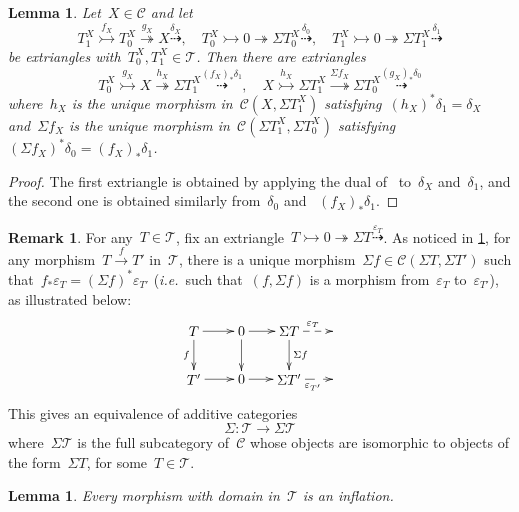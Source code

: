 \documentclass{amsart}
\newtheorem{lemma}[theorem]{Lemma}
\theoremstyle{definition}
\newtheorem{remark}[theorem]{Remark}
\newcommand{\ie}{\textit{i.e.}~} %
\newcommand{\cat}{\mathcal{C}}
\newcommand{\susp}{\Sigma}
\newcommand{\tc}{\mathcal{T}}
\newcommand{\infl}{\rightarrowtail}
\newcommand{\defl}{\twoheadrightarrow}
\newcommand{\eps}{\varepsilon}
\begin{document}
\begin{lemma}
\label{lem:shifts of extriangles}
Let~$X\in\cat$ and let
\[
T_1^X\overset{f_X}{\infl} T_0^X\overset{g_X}{\defl} X \overset{\delta_X}{\dashrightarrow}, \quad T_0^X\infl 0\defl \susp T_0^X\overset{\delta_0}{\dashrightarrow}, \quad T_1^X\infl 0\defl \susp T_1^X\overset{\delta_1}{\dashrightarrow}
\]
be extriangles with~$T_0^X,T_1^X\in\tc$.
Then there are extriangles
\[
T_0^X\overset{g_X}{\infl} X \overset{h_X}{\defl} \susp T_1^X \overset{(f_X)_\ast\delta_1}{\dashrightarrow}, \quad X \overset{h_X}{\infl} \susp T_1^X \overset{\susp f_X}{\defl} \susp T_0^X \overset{(g_X)_\ast\delta_0}{\dashrightarrow}
\]
where~$h_X$ is the unique morphism in~$\cat(X,\susp T_1^X)$ satisfying~$(h_X)^\ast\delta_1=\delta_X$ and~$\susp f_X$ is the unique morphism in~$\cat(\susp T_1^X,\susp T_0^X)$ satisfying~$(\susp f_X)^\ast\delta_0 = (f_X)_\ast\delta_1$.
\end{lemma}

\begin{proof}
The first extriangle is obtained by applying the dual of~\cite[Prop.~3.15]{NakaokaPalu} to~$\delta_X$ and~$\delta_1$, and the second one is obtained similarly from~$\delta_0$ and ~$(f_X)_\ast \delta_1$.
\end{proof}

\begin{remark}
\label{rem:equivalence Sigma}
For any~$T\in\tc$, fix an extriangle~$T\infl 0\defl\susp T\overset{\eps_T}{\dashrightarrow}$.
As noticed in \cref{lem:shifts of extriangles}, for any morphism~$T\overset{f}{\to}T'$ in~$\tc$, there is a unique morphism~$\susp f\in\cat(\susp T,\susp T')$ such that~${f_\ast\eps_T=(\susp f)^\ast\eps_{T'}}$ (\ie such that~$(f,\susp f)$ is a morphism from~$\eps_T$ to~$\eps_{T'}$), as illustrated below:
\[
\xy
(-12,6)*+{T}="0";
(0,6)*+{0}="2";
(12,6)*+{\susp T}="4";
(24,6)*+{}="6";
%
(-12,-6)*+{T'}="10";
(0,-6)*+{0}="12";
(12,-6)*+{\susp T'}="14";
(24,-6)*+{}="16";
%
{\ar "0";"2"};
{\ar "2";"4"};
{\ar@{-->}^{\eps_T} "4";"6"};
%
{\ar_{f} "0";"10"};
{\ar "2";"12"};
{\ar^{\susp f} "4";"14"};
%
{\ar "10";"12"};
{\ar "12";"14"};
{\ar@{-->}_{\eps_{T'}} "14";"16"};
\endxy
\]
This gives an equivalence of additive categories
\[
 \susp: \tc \to \susp\tc
\]
where~$\susp\tc$ is the full subcategory of~$\cat$ whose objects are isomorphic to objects of the form~$\susp T$, for some~$T\in\tc$.
\end{remark}

\begin{lemma}
\label{lem: mphs in T are inflations}
Every morphism with domain in~$\tc$ is an inflation.
\end{lemma}
\end{document}
